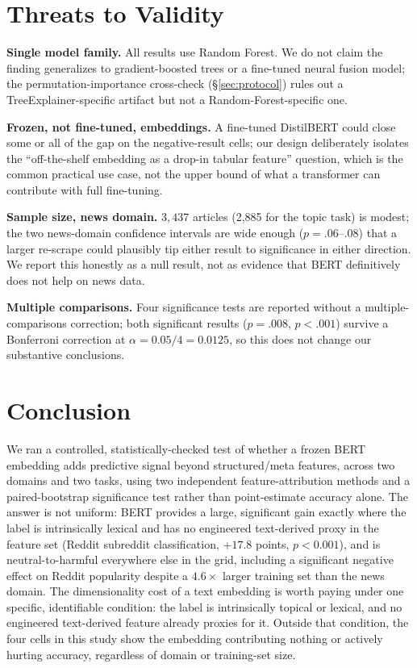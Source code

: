 \documentclass[conference]{IEEEtran}
\begin{document}
\section{Threats to Validity}
\label{sec:threats}

\textbf{Single model family.} All results use Random Forest. We do not claim the finding generalizes to gradient-boosted trees or a fine-tuned neural fusion model; the permutation-importance cross-check (\S\ref{sec:protocol}) rules out a TreeExplainer-specific artifact but not a Random-Forest-specific one.

\textbf{Frozen, not fine-tuned, embeddings.} A fine-tuned DistilBERT could close some or all of the gap on the negative-result cells; our design deliberately isolates the ``off-the-shelf embedding as a drop-in tabular feature'' question, which is the common practical use case, not the upper bound of what a transformer can contribute with full fine-tuning.

\textbf{Sample size, news domain.} $3{,}437$ articles (2,885 for the topic task) is modest; the two news-domain confidence intervals are wide enough ($p=.06$--$.08$) that a larger re-scrape could plausibly tip either result to significance in either direction. We report this honestly as a null result, not as evidence that BERT definitively does not help on news data.

\textbf{Multiple comparisons.} Four significance tests are reported without a multiple-comparisons correction; both significant results ($p=.008$, $p<.001$) survive a Bonferroni correction at $\alpha=0.05/4=0.0125$, so this does not change our substantive conclusions.

\section{Conclusion}

We ran a controlled, statistically-checked test of whether a frozen BERT embedding adds predictive signal beyond structured/meta features, across two domains and two tasks, using two independent feature-attribution methods and a paired-bootstrap significance test rather than point-estimate accuracy alone. The answer is not uniform: BERT provides a large, significant gain exactly where the label is intrinsically lexical and has no engineered text-derived proxy in the feature set (Reddit subreddit classification, $+17.8$ points, $p<0.001$), and is neutral-to-harmful everywhere else in the grid, including a significant negative effect on Reddit popularity despite a $4.6\times$ larger training set than the news domain. The dimensionality cost of a text embedding is worth paying under one specific, identifiable condition: the label is intrinsically topical or lexical, and no engineered text-derived feature already proxies for it. Outside that condition, the four cells in this study show the embedding contributing nothing or actively hurting accuracy, regardless of domain or training-set size.
\end{document}
